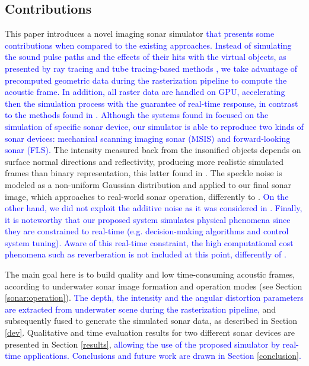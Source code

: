\documentclass[final,5p,times]{elsarticle}
\begin{document}
\subsection{Contributions}

This paper introduces a novel imaging sonar simulator \textcolor{blue}{that presents some contributions when compared to the existing approaches. Instead of simulating the sound pulse paths and the effects of their hits with the virtual objects, as presented by ray tracing and tube tracing-based methods \cite{bell1997,coiras2009,sac2015,demarco2015,gu2013,kwak2015,gueriot2010},
we take advantage of precomputed geometric data during the rasterization
pipeline to compute the acoustic frame. In addition, all raster data are handled on GPU, accelerating then the simulation process with the guarantee of
real-time response, in contrast to the methods found in
\cite{bell1997,coiras2009,sac2015,demarco2015}. Although the systems found in \cite{bell1997,coiras2009,sac2015,demarco2015,gu2013,kwak2015,gueriot2010} focused on the simulation of specific sonar device, our simulator is able to reproduce two kinds of sonar devices: mechanical scanning imaging sonar (MSIS)
and forward-looking sonar (FLS).} The intensity measured back from the
insonified objects depends on surface normal directions and reflectivity,
producing more realistic simulated frames than binary representation, this latter
found in \cite{gu2013,kwak2015}. The speckle noise is modeled as a non-uniform Gaussian distribution and applied to our final sonar image, which approaches to real-world sonar operation, differently to \cite{sac2015,demarco2015,gu2013,kwak2015,gueriot2010}. \textcolor{blue}{On the other hand, we did not exploit the additive noise as it was considered in \cite{sac2015,demarco2015}. Finally, it is noteworthy that our proposed system simulates physical phenomena since they are constrained to real-time (e.g. decision-making algorithms and control system tuning). Aware of this real-time constraint, the high computational cost phenomena such as reverberation is not included at this point, differently of \cite{sac2015,gueriot2010}.}

The main goal here is to build quality and low time\hyp{}consuming acoustic frames, according to underwater sonar image formation and operation modes (see Section \ref{sonar:operation}). \textcolor{blue}{The depth, the intensity and the angular distortion parameters are extracted from underwater scene during the rasterization pipeline,} and subsequently fused to generate the simulated sonar data, as described in Section \ref{dev}. Qualitative and time evaluation results for two different sonar devices are presented in Section \ref{results}, \textcolor{blue}{allowing the use of the proposed simulator by real-time applications. Conclusions and future work are drawn in Section \ref{conclusion}.}
\end{document}
